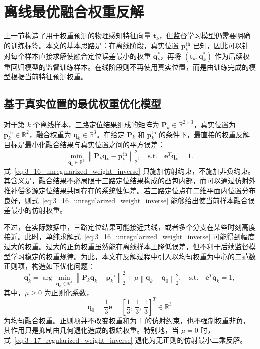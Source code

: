 \section{离线最优融合权重反解}
\label{sec:3_4}

上一节构造了用于权重预测的物理感知特征向量 \(\mathbf{t}_k\)，但监督学习模型仍需要明确的训练标签。本文的基本思路是：在离线阶段，真实位置 \(\mathbf{p}_k^{\mathrm{th}}\) 已知，因此可以针对每个样本直接求解使融合定位误差最小的权重 \(\mathbf{q}_k^\ast\)，再将 \((\mathbf{t}_k,\mathbf{q}_k^\ast)\) 作为后续权重回归模型的监督训练样本。在线阶段则不再使用真实位置，而是由训练完成的模型根据当前特征预测权重。

\subsection{基于真实位置的最优权重优化模型}
\label{subsec:3_4_1}

对于第 \(k\) 个离线样本，三路定位结果组成的矩阵为 \(\mathbf{P}_k\in\mathbb{R}^{2\times3}\)，真实位置为 \(\mathbf{p}_k^{\mathrm{th}}\in\mathbb{R}^{2}\)，融合权重为 \(\mathbf{q}_k\in\mathbb{R}^{3}\)。在给定 \(\mathbf{P}_k\) 和 \(\mathbf{p}_k^{\mathrm{th}}\) 的条件下，最直接的权重反解目标是最小化融合结果与真实位置之间的平方误差：
\begin{equation}
\min_{\mathbf{q}_k\in\mathbb{R}^{3}}
\left\|
\mathbf{P}_k\mathbf{q}_k-\mathbf{p}_k^{\mathrm{th}}
\right\|_2^2,
\quad
\mathrm{s.t.}\quad
\mathbf{e}^T\mathbf{q}_k=1.
\label{eq:3_16_unregularized_weight_inverse}
\end{equation}
式~\eqref{eq:3_16_unregularized_weight_inverse} 只施加仿射约束，不施加非负约束。其含义是，融合结果不必局限于三路定位结果构成的凸包内部，而可以通过仿射外推补偿多源定位结果共同存在的系统性偏差。若三路定位点在二维平面内位置分布良好，则式~\eqref{eq:3_16_unregularized_weight_inverse} 能够给出使当前样本融合误差最小的仿射权重。

不过，在实际数据中，三路定位结果可能接近共线，或者多个分支在某些时刻高度接近。此时，单纯求解式~\eqref{eq:3_16_unregularized_weight_inverse} 可能得到幅度过大的权重。过大的正负权重虽然能在离线样本上降低误差，但不利于后续监督模型学习稳定的权重规律。为此，本文在反解过程中引入以均匀权重为中心的二范数正则项，构造如下优化问题：
\begin{equation}
\mathbf{q}_k^\ast
=
\arg\min_{\mathbf{q}_k\in\mathbb{R}^{3}}
\left\|
\mathbf{P}_k\mathbf{q}_k-\mathbf{p}_k^{\mathrm{th}}
\right\|_2^2
+
\mu
\left\|
\mathbf{q}_k-\mathbf{q}_0
\right\|_2^2,
\quad
\mathrm{s.t.}\quad
\mathbf{e}^T\mathbf{q}_k=1,
\label{eq:3_17_regularized_weight_inverse}
\end{equation}
其中，\(\mu\ge0\) 为正则化系数，
\begin{equation}
\mathbf{q}_0
=
\frac{1}{3}\mathbf{e}
=
\left[
\frac{1}{3},\,
\frac{1}{3},\,
\frac{1}{3}
\right]^T
\in\mathbb{R}^{3}
\label{eq:3_18_uniform_weight}
\end{equation}
为均匀融合权重。正则项并不改变权重和为 1 的仿射约束，也不强制权重非负，其作用只是抑制由几何退化造成的极端权重。特别地，当 \(\mu=0\) 时，式~\eqref{eq:3_17_regularized_weight_inverse} 退化为无正则的仿射最小二乘反解。

